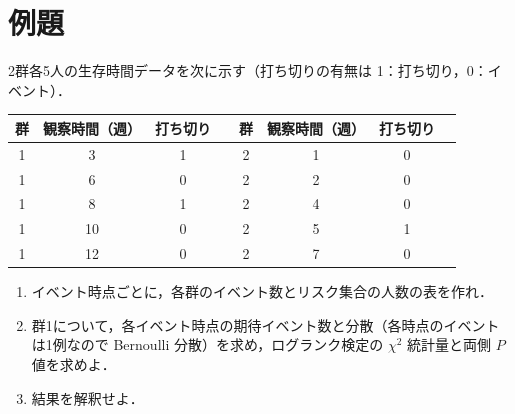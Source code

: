 \section{例題}\label{sec:m02-reidai}
\begin{reidai}\label{reidai:m02-1}
2群各5人の生存時間データを次に示す（打ち切りの有無は 1：打ち切り，0：イベント）．
\begin{center}\small
\begin{tabular}{@{}cccc@{\qquad}cccc@{}}
\toprule
群 & 観察時間（週） & 打ち切り & & 群 & 観察時間（週） & 打ち切り\\
\midrule
1 & 3 & 1 & & 2 & 1 & 0\\
1 & 6 & 0 & & 2 & 2 & 0\\
1 & 8 & 1 & & 2 & 4 & 0\\
1 & 10 & 0 & & 2 & 5 & 1\\
1 & 12 & 0 & & 2 & 7 & 0\\
\bottomrule
\end{tabular}
\end{center}
\begin{enumerate}[label=〔\arabic*〕]
\item イベント時点ごとに，各群のイベント数とリスク集合の人数の表を作れ．
\item 群1について，各イベント時点の期待イベント数と分散（各時点のイベントは1例なので Bernoulli 分散）を求め，ログランク検定の $\chi^2$ 統計量と両側 $P$ 値を求めよ．
\item 結果を解釈せよ．
\end{enumerate}
\end{reidai}

